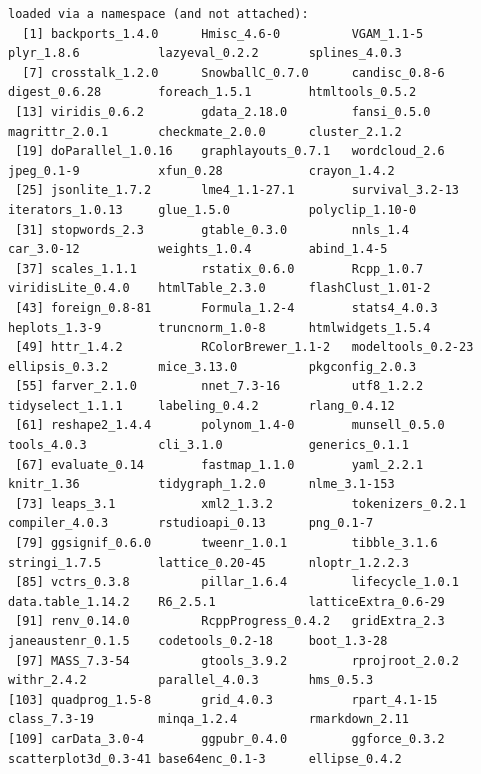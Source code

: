 \begin{appendices}
\begin{lstlisting}
loaded via a namespace (and not attached):
  [1] backports_1.4.0      Hmisc_4.6-0          VGAM_1.1-5           plyr_1.8.6           lazyeval_0.2.2       splines_4.0.3       
  [7] crosstalk_1.2.0      SnowballC_0.7.0      candisc_0.8-6        digest_0.6.28        foreach_1.5.1        htmltools_0.5.2     
 [13] viridis_0.6.2        gdata_2.18.0         fansi_0.5.0          magrittr_2.0.1       checkmate_2.0.0      cluster_2.1.2       
 [19] doParallel_1.0.16    graphlayouts_0.7.1   wordcloud_2.6        jpeg_0.1-9           xfun_0.28            crayon_1.4.2        
 [25] jsonlite_1.7.2       lme4_1.1-27.1        survival_3.2-13      iterators_1.0.13     glue_1.5.0           polyclip_1.10-0     
 [31] stopwords_2.3        gtable_0.3.0         nnls_1.4             car_3.0-12           weights_1.0.4        abind_1.4-5         
 [37] scales_1.1.1         rstatix_0.6.0        Rcpp_1.0.7           viridisLite_0.4.0    htmlTable_2.3.0      flashClust_1.01-2   
 [43] foreign_0.8-81       Formula_1.2-4        stats4_4.0.3         heplots_1.3-9        truncnorm_1.0-8      htmlwidgets_1.5.4   
 [49] httr_1.4.2           RColorBrewer_1.1-2   modeltools_0.2-23    ellipsis_0.3.2       mice_3.13.0          pkgconfig_2.0.3     
 [55] farver_2.1.0         nnet_7.3-16          utf8_1.2.2           tidyselect_1.1.1     labeling_0.4.2       rlang_0.4.12        
 [61] reshape2_1.4.4       polynom_1.4-0        munsell_0.5.0        tools_4.0.3          cli_3.1.0            generics_0.1.1      
 [67] evaluate_0.14        fastmap_1.1.0        yaml_2.2.1           knitr_1.36           tidygraph_1.2.0      nlme_3.1-153        
 [73] leaps_3.1            xml2_1.3.2           tokenizers_0.2.1     compiler_4.0.3       rstudioapi_0.13      png_0.1-7           
 [79] ggsignif_0.6.0       tweenr_1.0.1         tibble_3.1.6         stringi_1.7.5        lattice_0.20-45      nloptr_1.2.2.3      
 [85] vctrs_0.3.8          pillar_1.6.4         lifecycle_1.0.1      data.table_1.14.2    R6_2.5.1             latticeExtra_0.6-29 
 [91] renv_0.14.0          RcppProgress_0.4.2   gridExtra_2.3        janeaustenr_0.1.5    codetools_0.2-18     boot_1.3-28         
 [97] MASS_7.3-54          gtools_3.9.2         rprojroot_2.0.2      withr_2.4.2          parallel_4.0.3       hms_0.5.3           
[103] quadprog_1.5-8       grid_4.0.3           rpart_4.1-15         class_7.3-19         minqa_1.2.4          rmarkdown_2.11      
[109] carData_3.0-4        ggpubr_0.4.0         ggforce_0.3.2        scatterplot3d_0.3-41 base64enc_0.1-3      ellipse_0.4.2       
\end{lstlisting}


\end{appendices}
